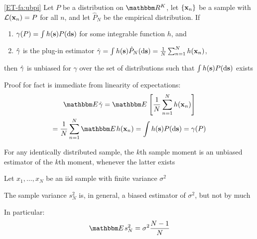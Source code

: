 \begin{frame}

    \vspace{2em}
    \Fact\eqref{ET-fa:ubpi}
    Let $P$ be a distribution on $\RR^K$, let $\{{\mathbf x}_n\}$
    be a sample with $\mathcal L({\mathbf x}_n) = P$ for all $n$, and let $\hat
    P_N$ be the empirical distribution. If 
    \begin{enumerate}
        \item $\gamma(P) = \int h({\mathbf s}) P(\mathop{}\!\mathrm{d} {\mathbf s})$ for some integrable
            function $h$, and
        \item $\hat \gamma$ is the plug-in estimator $\hat \gamma = \int h({\mathbf s})
            \hat P_N(\mathop{}\!\mathrm{d}  {\mathbf s}) = \frac{1}{N} \sum_{n=1}^N h({\mathbf x}_n)$,
    \end{enumerate}
    then $\hat \gamma$ is unbiased for $\gamma$ over the set of distributions such
    that $\int h({\mathbf s}) P(\mathop{}\!\mathrm{d} {\mathbf s})$ exists
  
\end{frame}

\begin{frame}

    \vspace{2em}
    Proof for fact is immediate from linearity of expectations:
    \begin{multline*}
        \EE \hgamma
        = \EE \left[ \frac{1}{N} \sum_{n=1}^N h(\boldx_n) \right]
        \\ = \frac{1}{N} \sum_{n=1}^N \EE h(\boldx_n) 
        = \int h(\bolds) P(\diff  \bolds) = \gamma(P)
    \end{multline*}
\end{frame}

\begin{frame}
    
    \vspace{2em}
    \Eg
    For any identically distributed sample, the $k$th sample moment is an
    unbiased estimator of the $k$th moment, whenever the latter exists

    \vspace{.7em}
    \Eg
    Let $x_1, \ldots, x_N$ be an {\sc iid} sample with finite variance
    $\sigma^2$
    
    The sample variance $s_N^2$ is, in general, a biased estimator of 
    $\sigma^2$, but not by much
    
    In particular:  
    \begin{equation*}
        \label{eq:esv}
        \EE s^2_N = \sigma^2 \frac{N-1}{N}
    \end{equation*}

\end{frame}


